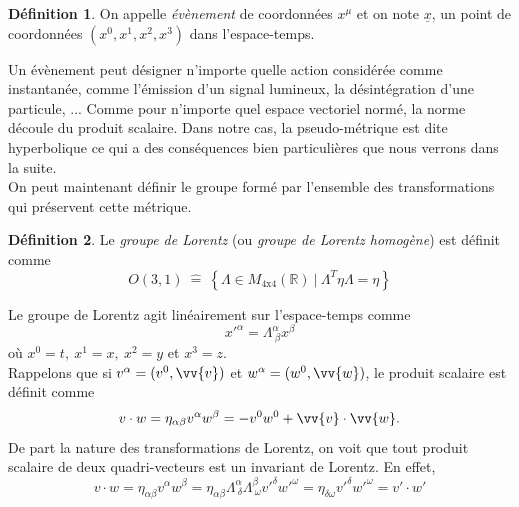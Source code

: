 \documentclass[a4paper,11pt]{report}
\theoremstyle{definition}
\theoremstyle{plain}
\theoremstyle{definition}
\newtheorem{defn}{Définition}[chapter]
\theoremstyle{remark}
\begin{document}
            \begin{defn}
                On appelle \textit{évènement} de coordonnées $x^\mu$ et on note $\underline{x}$, un point de coordonnées $(x^0,x^1,x^2,x^3)$ dans l'espace-temps.
            \end{defn}
            
            Un évènement peut désigner n'importe quelle action considérée comme instantanée, comme l'émission d'un signal lumineux, la désintégration d'une particule, ... Comme pour n'importe quel espace vectoriel normé, la norme découle du produit scalaire. Dans notre cas, la pseudo-métrique est dite hyperbolique ce qui a des conséquences bien particulières que nous verrons dans la suite.\\
            
            On peut maintenant définir le groupe formé par l'ensemble des transformations qui préservent cette métrique.
            \begin{defn}
                Le \textit{groupe de Lorentz} (ou \textit{groupe de Lorentz homogène}) est définit comme
                $$O(3,1)~\hat{=}~\left\{\Lambda\in M_{4\text{x}4}(\mathbb{R})~\big|~\Lambda^T\eta\Lambda = \eta\right\}$$
            \end{defn}
            
            Le groupe de Lorentz agit linéairement sur l'espace-temps comme
            \begin{equation}
                x'^\alpha = \Lambda^\alpha_{~\beta}x^\beta
            \end{equation}
            où $x^0 = t, ~x^1 = x, ~x^2 = y$ et $x^3 = z$.\\
            Rappelons que si $v^\alpha = (v^0,\vv{v})$ et $w^\alpha = (w^0,\vv{w})$, le produit scalaire est définit comme
            \begin{equation}
                v\cdot w = \eta_{\alpha\beta}v^\alpha w^\beta = -v^0w^0+\vv{v}\cdot\vv{w}.
            \end{equation}
            De part la nature des transformations de Lorentz, on voit que tout produit scalaire de deux quadri-vecteurs est un invariant de Lorentz. En effet, 
            \begin{equation}
                v\cdot w = \eta_{\alpha\beta}v^\alpha w^\beta = \eta_{\alpha\beta} \Lambda^\alpha_{~\delta}  \Lambda^\beta_{~\omega} v'^\delta w'^\omega = \eta_{\delta\omega}  v'^\delta w'^\omega = v'\cdot w'
            \end{equation}
            
\end{document}

